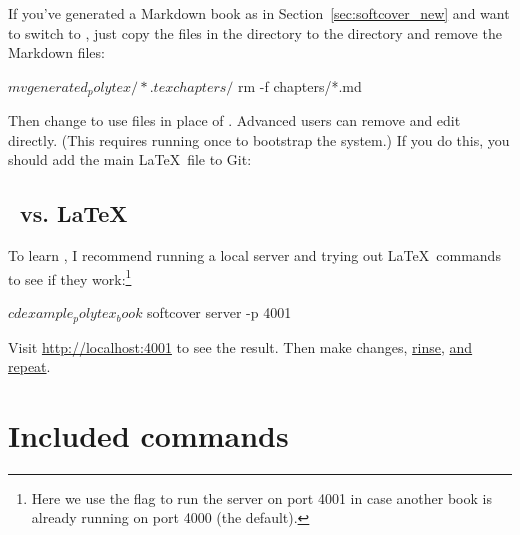 
If you've generated a Markdown book as in Section~\ref{sec:softcover_new} and want to switch to \PolyTeX, just copy the files in the  directory to the  directory and remove the Markdown files:

\begin{code}
$ mv generated_polytex/*.tex chapters/
$ rm -f chapters/*.md
\end{code}

\noindent Then change  to use  files in place of . Advanced users can remove  and edit  directly. (This requires running  once to bootstrap the system.) If you do this, you should add the main \LaTeX\ file to Git:


\subsection{\PolyTeX\ vs. \LaTeX} %
\label{sec:polytex_vs_latex}

To learn \PolyTeX, I recommend running a local server and trying out \LaTeX\ commands to see if they work:\footnote{Here we use the  flag to run the server on port 4001 in case another book is already running on port 4000 (the default).}

\begin{code}
$ cd example_polytex_book
$ softcover server -p 4001
\end{code}

\noindent Visit \href{http://localhost:4001}{http://localhost:4001} to see the result. Then make changes, \href{http://www.urbandictionary.com/define.php?term=rinse%20repeat}{rinse}, \href{http://www.urbandictionary.com/define.php?term=rinse%20repeat}{and repeat}.




\section{Included commands} %
\label{sec:included_commands}

